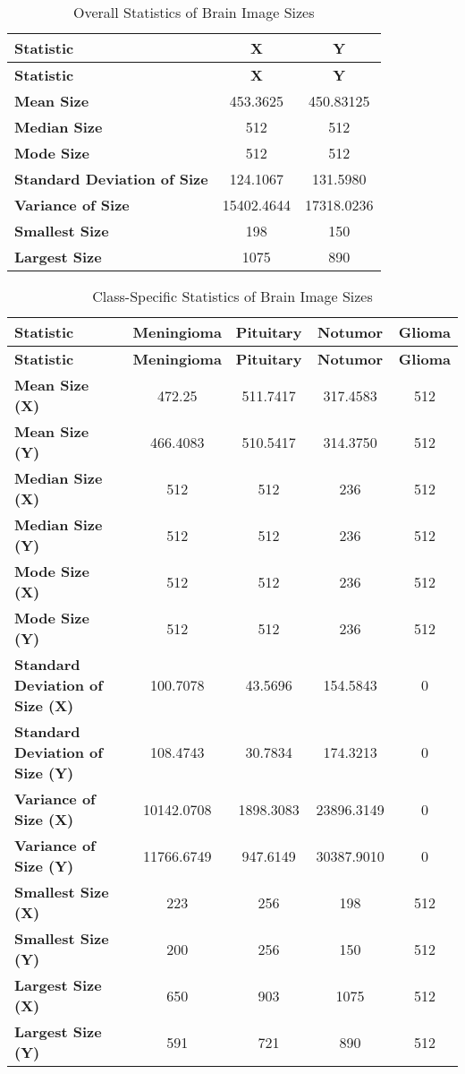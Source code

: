 \begin{longtable}{|l|c|c|}
\caption{Overall Statistics of Brain Image Sizes}\\
\hline
\textbf{Statistic} & \textbf{X} & \textbf{Y} \\
\hline
\endfirsthead
\hline
\textbf{Statistic} & \textbf{X} & \textbf{Y} \\
\hline
\endhead
\hline
\endfoot
\endlastfoot
\textbf{Mean Size} & 453.3625 & 450.83125 \\
\hline
\textbf{Median Size} & 512 & 512 \\
\hline
\textbf{Mode Size} & 512 & 512 \\
\hline
\textbf{Standard Deviation of Size} & 124.1067 & 131.5980 \\
\hline
\textbf{Variance of Size} & 15402.4644 & 17318.0236 \\
\hline
\textbf{Smallest Size} & 198 & 150 \\
\hline
\textbf{Largest Size} & 1075 & 890 \\
\hline
\end{longtable}

\vspace{1cm}

\begin{longtable}{|l|c|c|c|c|}
\caption{Class-Specific Statistics of Brain Image Sizes}\\
\hline
\textbf{Statistic} & \textbf{Meningioma} & \textbf{Pituitary} & \textbf{Notumor} & \textbf{Glioma} \\
\hline
\endfirsthead
\hline
\textbf{Statistic} & \textbf{Meningioma} & \textbf{Pituitary} & \textbf{Notumor} & \textbf{Glioma} \\
\hline
\endhead
\hline
\endfoot
\endlastfoot
\textbf{Mean Size (X)} & 472.25 & 511.7417 & 317.4583 & 512 \\
\hline
\textbf{Mean Size (Y)} & 466.4083 & 510.5417 & 314.3750 & 512 \\
\hline
\textbf{Median Size (X)} & 512 & 512 & 236 & 512 \\
\hline
\textbf{Median Size (Y)} & 512 & 512 & 236 & 512 \\
\hline
\textbf{Mode Size (X)} & 512 & 512 & 236 & 512 \\
\hline
\textbf{Mode Size (Y)} & 512 & 512 & 236 & 512 \\
\hline
\textbf{Standard Deviation of Size (X)} & 100.7078 & 43.5696 & 154.5843 & 0 \\
\hline
\textbf{Standard Deviation of Size (Y)} & 108.4743 & 30.7834 & 174.3213 & 0 \\
\hline
\textbf{Variance of Size (X)} & 10142.0708 & 1898.3083 & 23896.3149 & 0 \\
\hline
\textbf{Variance of Size (Y)} & 11766.6749 & 947.6149 & 30387.9010 & 0 \\
\hline
\textbf{Smallest Size (X)} & 223 & 256 & 198 & 512 \\
\hline
\textbf{Smallest Size (Y)} & 200 & 256 & 150 & 512 \\
\hline
\textbf{Largest Size (X)} & 650 & 903 & 1075 & 512 \\
\hline
\textbf{Largest Size (Y)} & 591 & 721 & 890 & 512 \\
\hline
\end{longtable}

